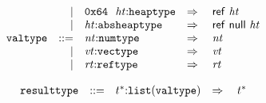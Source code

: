 $$\begin{array}[t]{@{}lrrl@{}l@{}l@{}l@{}}
& & | & \mathtt{0x64}~~{\mathit{ht}}{:}{\mathtt{heaptype}} & \quad\Rightarrow\quad{} & \mathsf{ref}~{\mathit{ht}} \\
& & | & {\mathit{ht}}{:}{\mathtt{absheaptype}} & \quad\Rightarrow\quad{} & \mathsf{ref}~\mathsf{null}~{\mathit{ht}} \\
& {\mathtt{valtype}} & ::= & {\mathit{nt}}{:}{\mathtt{numtype}} & \quad\Rightarrow\quad{} & {\mathit{nt}} \\
& & | & {\mathit{vt}}{:}{\mathtt{vectype}} & \quad\Rightarrow\quad{} & {\mathit{vt}} \\
& & | & {\mathit{rt}}{:}{\mathtt{reftype}} & \quad\Rightarrow\quad{} & {\mathit{rt}} \\
\end{array}
$$

\vspace{1ex}

$$
\begin{array}[t]{@{}lrrl@{}l@{}l@{}l@{}}
& {\mathtt{resulttype}} & ::= & {t^\ast}{:}{\mathtt{list}}({\mathtt{valtype}}) & \quad\Rightarrow\quad{} & {t^\ast} \\
\end{array}
$$

\vspace{1ex}

